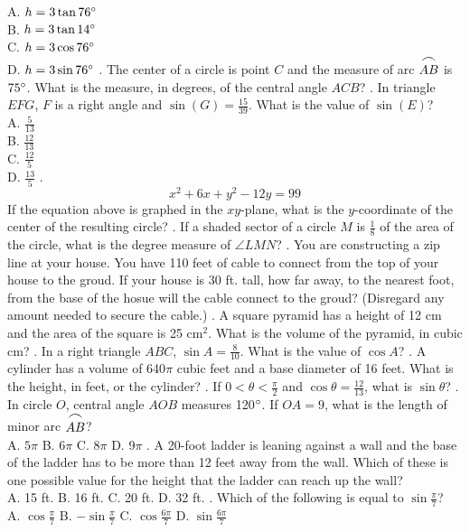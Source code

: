 \documentclass[../satmath.tex]{subfiles}
\begin{document}
A. $h=3\tan 76\degree$\\
B. $h=3\tan 14\degree$\\
C. $h=3\cos 76\degree$\\
D. $h=3\sin 76\degree$
.  The center of a circle is point $C$ and the measure of arc $\stackrel{\mbox{\large$\frown$}}{AB}$ is $75\degree$. What is the measure, in degrees, of the central angle $ACB$?
. In triangle $EFG$, $F$ is a right angle and $\sin (G) = \frac{15}{39}$. What is the value of $\sin (E)$?\\
A. $\frac{5}{13}$\\
B. $\frac{12}{13}$\\
C. $\frac{12}{5}$\\
D. $\frac{13}{5}$
. 
\[x^2+6x+y^2-12y=99\]
If the equation above is graphed in the $xy$-plane, what is the $y$-coordinate of the center of the resulting circle?
. If a shaded sector of a circle $M$ is $\frac{1}{8}$ of the area of the circle, what is the degree measure of $\angle LMN$?
. You are constructing a zip line at your house. You have 110 feet of cable to connect from the top of your house to the groud. If your house is 30 ft. tall, how far away, to 
the nearest foot, from the base of the hosue will the cable connect to the groud? (Disregard any amount needed to secure the cable.)
. A square pyramid has a height of 12 cm and the area of the square is 25 cm$^2$. What is the volume of the pyramid, in cubic cm?
. In a right triangle $ABC$, $\sin A = \frac{8}{10}$. What is the value of $\cos A$?
. A cylinder has a volume of 640$\pi$ cubic feet and a base diameter of 16 feet. What is the height, in feet, or the cylinder?
. If $0<\theta<\frac{\pi}{2}$ and $\cos \theta = \frac{12}{13}$, what is $\sin \theta$?
. In circle $O$, central angle $AOB$ measures 120$\degree$. If $OA=9$, what is the length of minor arc $\stackrel{\mbox{\large$\frown$}}{AB}$?\\
A. $5\pi$ \quad B. 6$\pi$ \quad C. 8$\pi$ \quad D. 9$\pi$
. A 20-foot ladder is leaning against a wall and the base of the ladder has to be more than 12 feet away from the wall. Which of these is one possible value for the 
height that the ladder can reach up the wall?\\
A. 15 ft. \quad B. 16 ft. \quad C. 20 ft. \quad D. 32 ft. 
. Which of the following is equal to $\sin \frac{\pi}{7}$?\\
A. $\cos \frac{\pi}{7}$ \quad B. $-\sin \frac{\pi}{7}$ \quad C. $\cos \frac{6\pi}{7}$ \quad D. $\sin \frac{6\pi}{7}$ 
\end{document}
